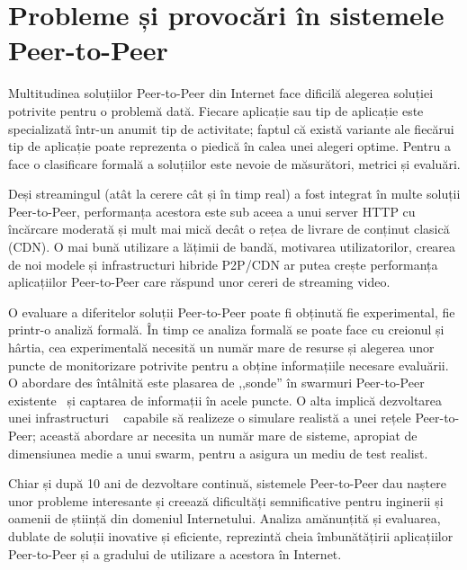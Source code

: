 \section{Probleme și provocări în sistemele Peer-to-Peer}
\label{sec:p2p-systems:issues}

Multitudinea soluțiilor Peer-to-Peer din Internet face dificilă alegerea
soluției potrivite pentru o problemă dată. Fiecare aplicație sau tip de
aplicație este specializată într-un anumit tip de activitate; faptul că
există variante ale fiecărui tip de aplicație poate reprezenta o piedică în
calea unei alegeri optime. Pentru a face o clasificare formală a soluțiilor
este nevoie de măsurători, metrici și evaluări.

Deși streamingul (atât la cerere cât și în timp real) a fost integrat în multe
soluții Peer-to-Peer, performanța acestora este sub aceea a unui server HTTP
cu încărcare moderată și mult mai mică decât o rețea de livrare de conținut
clasică (CDN). O mai bună utilizare a lățimii de bandă, motivarea
utilizatorilor, crearea de noi modele și infrastructuri hibride P2P/CDN ar putea
crește performanța aplicațiilor Peer-to-Peer care răspund unor cereri de
streaming video.

O evaluare a diferitelor soluții Peer-to-Peer poate fi obținută fie
experimental, fie printr-o analiză formală. În timp ce analiza formală se
poate face cu creionul și hârtia, cea experimentală necesită un număr mare de
resurse și alegerea unor puncte de monitorizare potrivite pentru a obține
informațiile necesare evaluării. O abordare des întâlnită este plasarea de
,,sonde'' în swarmuri Peer-to-Peer existente~\cite{corr-overlay} și captarea
de informații în acele puncte. O alta implică dezvoltarea unei infrastructuri
~\cite{bt-vi} capabile să realizeze o simulare realistă a unei rețele
Peer-to-Peer; această abordare ar necesita un număr mare de sisteme, apropiat
de dimensiunea medie a unui swarm, pentru a asigura un mediu de test realist.

Chiar și după 10 ani de dezvoltare continuă, sistemele Peer-to-Peer dau naștere
unor probleme interesante și creează dificultăți semnificative pentru
inginerii și oamenii de știință din domeniul Internetului. Analiza
amănunțită și evaluarea, dublate de soluții inovative și eficiente, reprezintă
cheia îmbunătățirii aplicațiilor Peer-to-Peer și a gradului de utilizare
a acestora în Internet.
